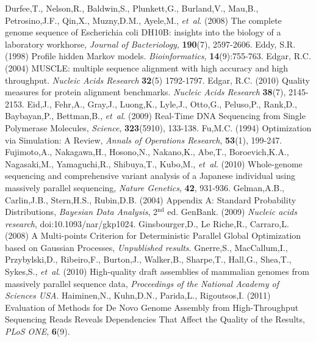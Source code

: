 \documentclass[phd,tocprelim]{cornell}
\begin{document}
\begin{thebibliography}{}
 Durfee,T., Nelson,R., Baldwin,S., Plunkett,G., Burland,V., Mau,B., Petrosino,J.F., Qin,X., Muzny,D.M., Ayele,M., {\it et~al}. (2008) The complete genome sequence of Escherichia coli DH10B: insights into the biology of a laboratory workhorse, {\it Journal of Bacteriology}, {\bf 190}(7), 2597-2606.
 Eddy, S.R. (1998) Profile hidden Markov models. \textit{Bioinformatics}, \textbf{14}(9):755-763.
Edgar, R.C. (2004) MUSCLE: multiple sequence alignment with high accuracy and high throughput. \textit{Nucleic Acids Research} \textbf{32}(5) 1792-1797.
Edgar, R.C. (2010) Quality measures for protein alignment benchmarks. \textit{Nucleic Acids Research} \textbf{38}(7), 2145-2153.
 Eid,J., Fehr,A., Gray,J., Luong,K., Lyle,J., Otto,G., Peluso,P., Rank,D., Baybayan,P., Bettman,B., {\it et~al}. (2009) Real-Time DNA Sequencing from Single Polymerase Molecules, {\it Science}, {\bf 323}(5910), 133-138.
 Fu,M.C. (1994) Optimization via Simulation: A Review, {\it Annals of Operations Research}, {\bf 53}(1), 199-247.
 Fujimoto,A., Nakagawa,H., Hosono,N., Nakano,K., Abe,T., Boroevich,K.A., Nagasaki,M., Yamaguchi,R., Shibuya,T., Kubo,M., {\it et~al}. (2010) Whole-genome sequencing and comprehensive variant analysis of a Japanese individual using massively parallel sequencing, {\it Nature Genetics}, {\bf 42}, 931-936.
 Gelman,A.B., Carlin,J.B., Stern,H.S., Rubin,D.B. (2004) Appendix A: Standard Probability Distributions, {\it Bayesian Data Analysis}, 2$^{\text{nd}}$ ed.
GenBank. (2009) \textit{Nucleic acids research}, doi:10.1093/nar/gkp1024.
 Ginsbourger,D., Le Riche,R., Carraro,L. (2008) A Multi-points Criterion for Deterministic Parallel Global Optimization based on Gaussian Processes, {\it Unpublished results}.
 Gnerre,S., MacCallum,I., Przybylski,D., Ribeiro,F., Burton,J., Walker,B., Sharpe,T., Hall,G., Shea,T., Sykes,S., {\it et~al}. (2010) High-quality draft assemblies of mammalian genomes from massively parallel sequence data, {\it Proceedings of the National Academy of Sciences USA}.
 Haiminen,N., Kuhn,D.N., Parida,L., Rigoutsos,I. (2011) Evaluation of Methods for De Novo Genome Assembly from High-Throughput Sequencing Reads Reveals Dependencies That Affect the Quality of the Results, {\it PLoS ONE}, {\bf 6}(9).

\end{thebibliography}
\end{document}
